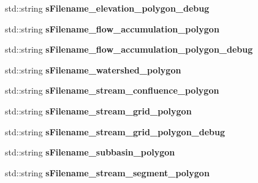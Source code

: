 \begin{DoxyCompactItemize}
\item 
\hypertarget{classhexwatershed_1_1domain_aab217d0d54135663b80f65ab416a294a}{std\-::string {\bfseries s\-Filename\-\_\-elevation\-\_\-polygon\-\_\-debug}}\label{classhexwatershed_1_1domain_aab217d0d54135663b80f65ab416a294a}

\item 
\hypertarget{classhexwatershed_1_1domain_ab5b6a7a63ac54ffe127704b804fbf902}{std\-::string {\bfseries s\-Filename\-\_\-flow\-\_\-accumulation\-\_\-polygon}}\label{classhexwatershed_1_1domain_ab5b6a7a63ac54ffe127704b804fbf902}

\item 
\hypertarget{classhexwatershed_1_1domain_aad07742f02d46cc27f749e88c4d8198f}{std\-::string {\bfseries s\-Filename\-\_\-flow\-\_\-accumulation\-\_\-polygon\-\_\-debug}}\label{classhexwatershed_1_1domain_aad07742f02d46cc27f749e88c4d8198f}

\item 
\hypertarget{classhexwatershed_1_1domain_a1485608eea9c7f5cca53ee07cdb21b99}{std\-::string {\bfseries s\-Filename\-\_\-watershed\-\_\-polygon}}\label{classhexwatershed_1_1domain_a1485608eea9c7f5cca53ee07cdb21b99}

\item 
\hypertarget{classhexwatershed_1_1domain_a0336019c551b96cb417539db336c9491}{std\-::string {\bfseries s\-Filename\-\_\-stream\-\_\-confluence\-\_\-polygon}}\label{classhexwatershed_1_1domain_a0336019c551b96cb417539db336c9491}

\item 
\hypertarget{classhexwatershed_1_1domain_a3bd210d0b5641b0f1c802bc30a2da523}{std\-::string {\bfseries s\-Filename\-\_\-stream\-\_\-grid\-\_\-polygon}}\label{classhexwatershed_1_1domain_a3bd210d0b5641b0f1c802bc30a2da523}

\item 
\hypertarget{classhexwatershed_1_1domain_a37139f277cdc2d45bd86a3925828f46b}{std\-::string {\bfseries s\-Filename\-\_\-stream\-\_\-grid\-\_\-polygon\-\_\-debug}}\label{classhexwatershed_1_1domain_a37139f277cdc2d45bd86a3925828f46b}

\item 
\hypertarget{classhexwatershed_1_1domain_a2c268f965da15520aed905681bc26a3c}{std\-::string {\bfseries s\-Filename\-\_\-subbasin\-\_\-polygon}}\label{classhexwatershed_1_1domain_a2c268f965da15520aed905681bc26a3c}

\item 
\hypertarget{classhexwatershed_1_1domain_afdd8ae066d65ca7e0fdd364f331086b6}{std\-::string {\bfseries s\-Filename\-\_\-stream\-\_\-segment\-\_\-polygon}}\label{classhexwatershed_1_1domain_afdd8ae066d65ca7e0fdd364f331086b6}


\end{DoxyCompactItemize}
